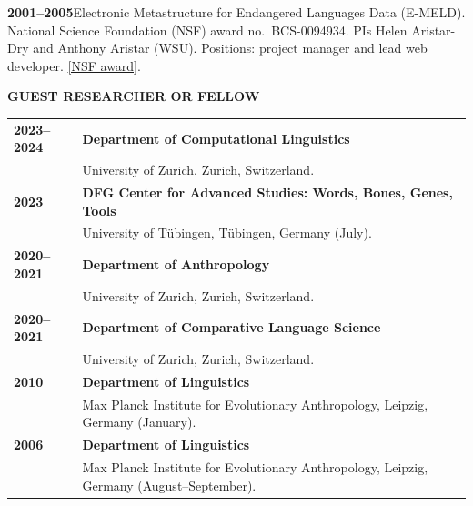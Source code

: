 \documentclass[11pt]{article}
\newcommand{\hangpara}{
 \setlength{\parindent}{0in} %
 \hangindent=0.42in %
}
\begin{document}
\vskip 6pt
\hangpara
{\bf 2001--2005}\hspace{1ex}Electronic Metastructure for Endangered Languages Data (E-MELD). National Science Foundation (NSF) award no.\ BCS-0094934. PIs Helen Aristar-Dry and Anthony Aristar (WSU). Positions: project manager and lead web developer. \href{https://www.nsf.gov/awardsearch/showAward?AWD_ID=0094934}{[NSF award]}. 

\vskip 20pt
\begin{flushleft}
{\bf GUEST RESEARCHER OR FELLOW}
\end{flushleft}
\begin{tabular}{lp{5.5in}}
\bf 2023--2024 & {\bf Department of Computational Linguistics} \\
& University of Zurich, Zurich, Switzerland. \\
\bf 2023 & {\bf DFG Center for Advanced Studies: Words, Bones, Genes, Tools} \\
& University of Tübingen, Tübingen, Germany (July). \\
\bf 2020--2021 & {\bf Department of Anthropology} \\
& University of Zurich, Zurich, Switzerland. \\
\bf 2020--2021 & {\bf Department of Comparative Language Science} \\
& University of Zurich, Zurich, Switzerland. \\
\bf 2010 & {\bf Department of Linguistics}\\
& Max Planck Institute for Evolutionary Anthropology, Leipzig, Germany (January). \\
\bf 2006 & {\bf Department of Linguistics}\\
& Max Planck Institute for Evolutionary Anthropology, Leipzig, Germany (August--September). \\
\end{tabular}
\end{document}
